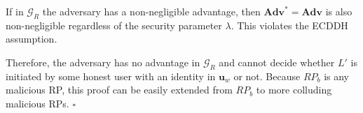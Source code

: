 If in $\mathcal{G}_R$ the adversary has a non-negligible advantage, then $\mathbf{Adv}^*={\mathbf{Adv}}$ is also non-negligible regardless of the security parameter $\lambda$. This violates the ECDDH assumption.

Therefore, the adversary has no advantage in $\mathcal{G}_R$ and cannot decide whether $L'$ is initiated by some honest user with an identity in $\mathbf{u}_w$ or not.
Because $RP_b$ is any malicious RP, this proof can be easily extended from $RP_b$ to more colluding malicious RPs.
\hfill $\square$


